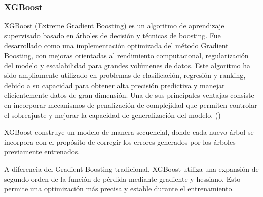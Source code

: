 






\subsubsection{XGBoost}
XGBoost (Extreme Gradient Boosting) es un algoritmo de aprendizaje supervisado basado en árboles de decisión y técnicas de boosting. Fue desarrollado como una implementación optimizada del método Gradient Boosting, con mejoras orientadas al rendimiento computacional, regularización del modelo y escalabilidad para grandes volúmenes de datos.
Este algoritmo ha sido ampliamente utilizado en problemas de clasificación, regresión y ranking, debido a su capacidad para obtener alta precisión predictiva y manejar eficientemente datos de gran dimensión. Una de sus principales ventajas consiste en incorporar mecanismos de penalización de complejidad que permiten controlar el sobreajuste y mejorar la capacidad de generalización del modelo. (\cite{chen2016xgboost})

XGBoost construye un modelo de manera secuencial, donde cada nuevo árbol se incorpora con el propósito de corregir los errores generados por los árboles previamente entrenados.

A diferencia del Gradient Boosting tradicional, XGBoost utiliza una expansión de segundo orden de la función de pérdida mediante gradiente y hessiano. Esto permite una optimización más precisa y estable durante el entrenamiento.

